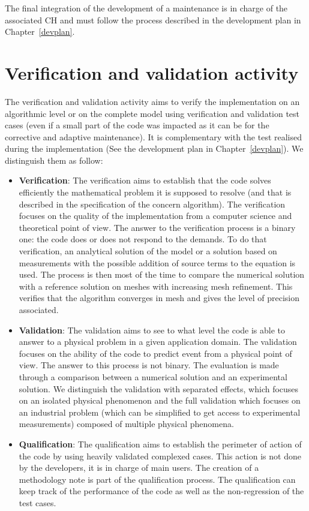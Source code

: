 The final integration of the development of a maintenance is in charge of the
associated CH and must follow the process described in the development plan in
Chapter~\ref{devplan}.

\section{Verification and validation activity}
\label{vv}
The verification and validation activity aims to verify the implementation on
an algorithmic level or on the complete model using verification and validation
test cases (even if a small part of the code was impacted as it can be for the
corrective and adaptive maintenance). It is complementary with the test
realised during the implementation (See the development plan in
Chapter~\ref{devplan}). We distinguish them as follow:
\begin{itemize}
\item \textbf{Verification}: The verification aims to establish that the code
  solves efficiently the mathematical problem it is supposed to resolve (and
  that is described in the specification of the concern algorithm). The
  verification focuses on the quality of the implementation from a computer
  science and theoretical point of view. The answer to the verification process
  is a binary one: the code does or does not respond to the demands. To do that
  verification, an analytical solution of the model or a solution based on
  measurements with the possible addition of source terms to the equation is
  used. The process is then most of the time to compare the numerical solution
  with a reference solution on meshes with increasing mesh refinement.  This
  verifies that the algorithm converges in mesh and gives the level of
  precision associated.
\item \textbf{Validation}: The validation aims to see to what level the code is
  able to answer to a physical problem in a given application domain.  The
  validation focuses on the ability of the code to predict event from a
  physical point of view. The answer to this process is not binary. The
  evaluation is made through a comparison between a numerical solution and an
  experimental solution.  We distinguish the validation with separated effects,
  which focuses on an isolated physical phenomenon and the full validation
  which focuses on an industrial problem (which can be simplified to get access
  to experimental measurements) composed of multiple physical phenomena.
\item \textbf{Qualification}: The qualification aims to establish the perimeter
  of action of the code by using heavily validated complexed cases. This action
  is not done by the developers, it is in charge of main users. The creation of
  a methodology note is part of the qualification process. The qualification
  can keep track of the performance of the code as well as the non-regression
  of the test cases.
\end{itemize}

